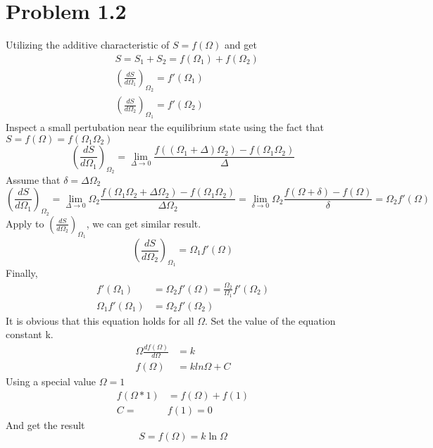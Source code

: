 \documentclass{article}
\begin{document}
\section*{Problem 1.2}
Utilizing the additive characteristic of $S=f(\Omega)$ and get
\begin{align}
&S=S_1+S_2=f(\Omega_1)+f(\Omega_2)\\
&(\frac{dS}{d\Omega_1})_{\Omega_2}=f'(\Omega_1)\\
&(\frac{dS}{d\Omega_2})_{\Omega_1}=f'(\Omega_2)
\end{align}
Inspect a small pertubation near the equilibrium state using the fact that $S=f(\Omega)=f(\Omega_1\Omega_2)$
\begin{equation}
(\frac{dS}{d\Omega_1})_{\Omega_2}=\lim_{\Delta\rightarrow 0}{\frac{f((\Omega_1+\Delta)\Omega_2)-f(\Omega_1\Omega_2)}{\Delta}}
\end{equation}
Assume that $\delta=\Delta\Omega_2$
\begin{equation}
(\frac{dS}{d\Omega_1})_{\Omega_2}=\lim_{\Delta\rightarrow 0}{\Omega_2\frac{f(\Omega_1\Omega_2+\Delta\Omega_2)-f(\Omega_1\Omega_2)}{\Delta\Omega_2}}=\lim_{\delta\rightarrow 0}{\Omega_2\frac{f(\Omega+\delta)-f(\Omega)}{\delta}}=\Omega_2f'(\Omega)
\end{equation}
Apply to $(\frac{dS}{d\Omega_2})_{\Omega_1}$, we can get similar result.
\begin{equation}
(\frac{dS}{d\Omega_2})_{\Omega_1}=\Omega_1f'(\Omega)
\end{equation}
Finally,
\begin{align}
f'(\Omega_1)&=\Omega_2f'(\Omega)=\frac{\Omega_2}{\Omega_1}f'(\Omega_2)\\
\Omega_1f'(\Omega_1)&=\Omega_2f'(\Omega_2)
\end{align}
It is obvious that this equation holds for all $\Omega$. Set the value of the equation constant k.
\begin{align}
\Omega\frac{df(\Omega)}{d\Omega}&=k\\
f(\Omega)&=kln\Omega+C
\end{align}
Using a special value $\Omega=1$
\begin{align}
f(\Omega*1)&=f(\Omega)+f(1)\\
C=&f(1)=0
\end{align}
And get the result
\begin{equation}
S=f(\Omega)=k\ln\Omega
\end{equation}
\end{document}
